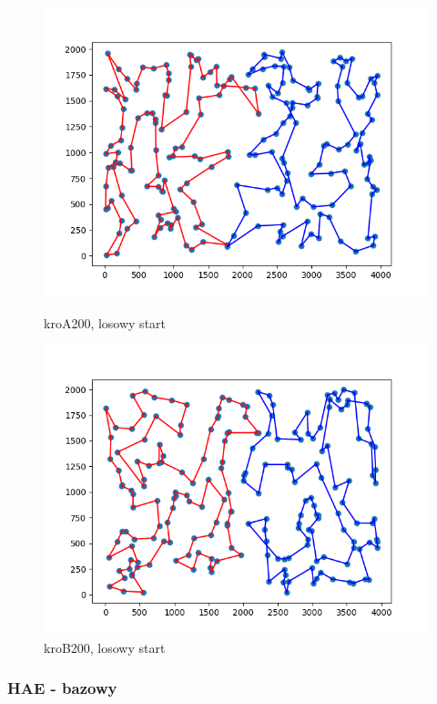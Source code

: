 \documentclass[11pt]{article}
\begin{document}
\begin{figure}[H]
    \begin{minipage}[t]{0.45\textwidth}
        \centering
        \includegraphics[width=\linewidth]{best_paths/kroA200/Greedy_cycle}
        \caption{kroA200, losowy start}
    \end{minipage}
    \hfill
    \begin{minipage}[t]{0.45\textwidth}
        \centering
        \includegraphics[width=\linewidth]{best_paths/kroB200/Greedy_cycle}
        \caption{kroB200, losowy start}
    \end{minipage}\label{fig:figure21}
\end{figure}

\subsubsection{HAE - bazowy}
\end{document}
